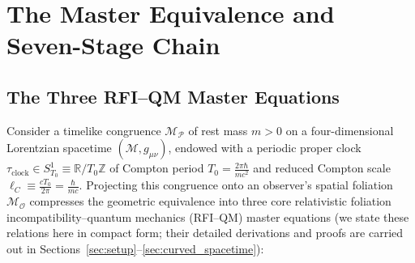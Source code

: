 \documentclass[11pt, a4paper]{article}
\theoremstyle{definition}
\begin{document}
\section{The Master Equivalence and Seven-Stage Chain}
\label{sec:master_overview}

\subsection{The Three RFI--QM Master Equations}
\label{sec:master_equation}

Consider a timelike congruence $\mathcal{M}_{\mathcal{P}}$ of rest mass $m > 0$ on a four-dimensional Lorentzian spacetime $(\mathcal{M}, g_{\mu\nu})$, endowed with a periodic proper clock $\tau_{\text{clock}} \in S^1_{T_0} \equiv \mathbb{R}/T_0\mathbb{Z}$ of Compton period $T_0 = \frac{2\pi\hbar}{mc^2}$ and reduced Compton scale $\ell_C \equiv \frac{c T_0}{2\pi} = \frac{\hbar}{mc}$. Projecting this congruence onto an observer's spatial foliation $\mathcal{M}_{\mathcal{O}}$ compresses the geometric equivalence into three core relativistic foliation incompatibility--quantum mechanics (RFI--QM) master equations (we state these relations here in compact form; their detailed derivations and proofs are carried out in Sections~\ref{sec:setup}--\ref{sec:curved_spacetime}):
\end{document}
